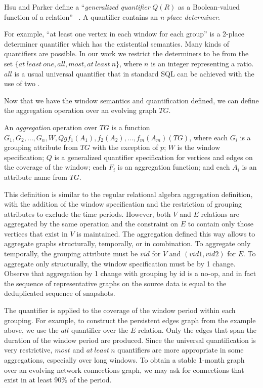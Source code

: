 Hsu and Parker define a ``{\em generalized quantifier} $Q(R)$ as a
Boolean-valued function of a relation'' ~\cite{Hsu1995}.  A quantifier
contains an {\em n-place determiner}.

For example, ``at least one vertex in each window for each group'' is
a 2-place determiner quantifier which has the existential semantics.
Many kinds of quantifiers are possible.  In our work we restrict the
determiners to be from the set $\{at\ least\ one, all, most,
at\ least\ n\}$, where $n$ is an integer representing a ratio.  $all$
is a usual universal quantifier that in standard SQL can be achieved
with the use of two .

Now that we have the window semantics and quantification defined, we
can define the aggregation operation over an evolving graph $TG$.

\begin{definition}
An {\em aggregation} operation over $TG$ is a function \\ $G_1, G_2,
\ldots, G_n, W, Q g f_1(A_1), f_2(A_2), \ldots, f_m(A_m)(TG)$, where
each $G_i$ is a grouping attribute from $TG$ with the exception of
$p$; $W$ is the window specification; $Q$ is a generalized quantifier
specification for vertices and edges on the coverage of the window;
each $F_i$ is an aggregation function; and each $A_i$ is an attribute
name from $TG$.
\label{def:agg}
\end{definition}

This definition is similar to the regular relational algebra
aggregation definition, with the addition of the window specification
and the restriction of grouping attributes to exclude the time
periods.  However, both $V$ and $E$ relations are aggregated by the
same operation and the constraint on $E$ to contain only those
vertices that exist in $V$ is maintained.  The aggregation defined
this way allows to aggregate graphs structurally, temporally, or in
combination.  To aggregate only temporally, the grouping attribute
must be $vid$ for $V$ and $(vid1, vid2)$ for $E$.  To aggregate only
structurally, the window specification must be by 1 change.  Observe
that aggregation by 1 change with grouping by id is a no-op, and in
fact the sequence of representative graphs on the source data is equal
to the deduplicated sequence of snapshots.

The quantifier is applied to the coverage of the window period within
each grouping.  For example, to construct the persistent edges graph
from the example above, we use the $all$ quantifier over the $E$ relation.
Only the edges that span the duration of the window period are
produced.  Since the universal quantification is very restrictive,
$most$ and $at\ least\ n$ quantifiers are more appropriate in some
aggregations, especially over long windows.  To obtain a stable
1-month graph over an evolving network connections graph, we may ask
for connections that exist in at least 90\% of the period.

